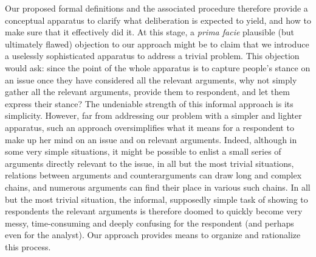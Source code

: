 \documentclass[version=3.21, pagesize, twoside=off, bibliography=totoc, DIV=calc, fontsize=12pt, a4paper, french, english]{scrartcl}
\begin{document}
Our proposed formal definitions and the associated procedure therefore provide a conceptual apparatus to clarify what deliberation is expected to yield, and how to make sure that it effectively did it. At this stage, a \emph{prima facie} plausible (but ultimately flawed) objection to our approach might be to claim that we introduce a uselessly sophisticated apparatus to address a trivial problem. This objection would ask: since the point of the whole apparatus is to capture people's stance on an issue once they have considered all the relevant arguments, why not simply gather all the relevant arguments, provide them to respondent, and let them express their stance? The undeniable strength of this informal approach is its simplicity. However, far from addressing our problem with a simpler and lighter apparatus, such an approach oversimplifies what it means for a respondent to make up her mind on an issue and on relevant arguments. Indeed, although in some very simple situations, it might be possible to enlist a small series of arguments directly relevant to the issue, in all but the most trivial situations, relations between arguments and counterarguments can draw long and complex chains, and numerous arguments can find their place in various such chains. In all but the most trivial situation, the informal, supposedly simple task of showing to respondents the relevant arguments is therefore doomed to quickly become very messy, time-consuming and deeply confusing for the respondent (and perhaps even for the analyst). Our approach provides means to organize and rationalize this process.
\end{document}
